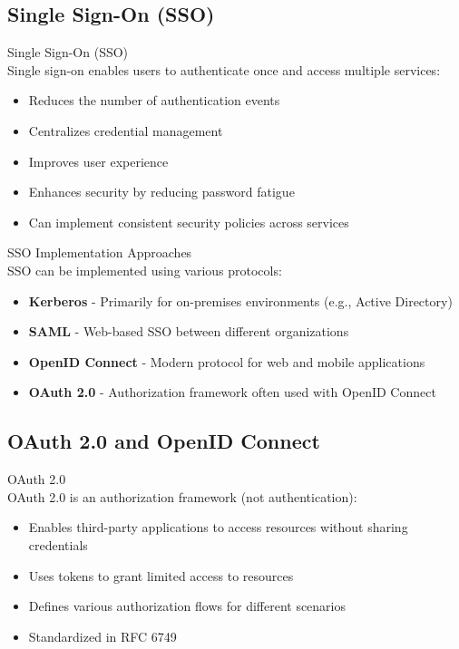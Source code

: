 \subsection{Single Sign-On (SSO)}

\begin{definition}{Single Sign-On (SSO)}\\
Single sign-on enables users to authenticate once and access multiple services:
\begin{itemize}
    \item Reduces the number of authentication events
    \item Centralizes credential management
    \item Improves user experience
    \item Enhances security by reducing password fatigue
    \item Can implement consistent security policies across services
\end{itemize}
\end{definition}

\begin{concept}{SSO Implementation Approaches}\\
SSO can be implemented using various protocols:
\begin{itemize}
    \item \textbf{Kerberos} - Primarily for on-premises environments (e.g., Active Directory)
    \item \textbf{SAML} - Web-based SSO between different organizations
    \item \textbf{OpenID Connect} - Modern protocol for web and mobile applications
    \item \textbf{OAuth 2.0} - Authorization framework often used with OpenID Connect
\end{itemize}
\end{concept}

\subsection{OAuth 2.0 and OpenID Connect}

\begin{definition}{OAuth 2.0}\\
OAuth 2.0 is an authorization framework (not authentication):
\begin{itemize}
    \item Enables third-party applications to access resources without sharing credentials
    \item Uses tokens to grant limited access to resources
    \item Defines various authorization flows for different scenarios
    \item Standardized in RFC 6749
\end{itemize}
\end{definition}

